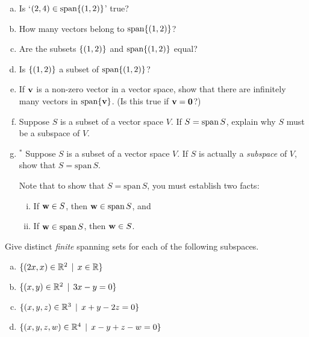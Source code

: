 \begin{prob}
\begin{enumerate}[a)]
%
\item Is `$(2,4) \in \textrm{span}\{(1,2)\}$' true?
\medskip
%

\item\sov How many vectors belong to $\textrm{span}\{(1,2)\}$?
\medskip
%
\item Are the subsets $\{(1,2) \}$ and  $\textrm{span}\{(1,2)\}$ equal?
\medskip
%
\item\sov Is  $\{(1,2) \}$ a subset of  $\textrm{span}\{(1,2)\}$?
\medskip
%
\item 
\medskip If $\mathbf{v}$ is a non-zero vector in a vector space, show that there are infinitely many vectors in $\textrm{span}\{\mathbf{v}\}$. (Is this true if $\mathbf{v}=\mathbf{0}$?)\medskip
%
\item\sov  Suppose $S$ is a subset of a vector space $V$.  If $S= \textrm{span}\, S$,  explain why $S$ must be a subspace of $V$.  
\medskip
%

\item$^\ast$ Suppose $S$ is a subset of a vector space $V$.  If $S$ is actually a {\it subspace} of $V$, show that  $S= \text{span}\, S$.  

\medskip Note that to show that $S= \text{span}\, S$, you must establish two facts:
\begin{enumerate}[(i)]
\item If $\mathbf{w}\in S$, then $\mathbf{w}\in \text{span}\, S$, and

\item If $\mathbf{w}\in \text{span}\, S$, then $\mathbf{w}\in S$.
\end{enumerate}
\medskip
%

\end{enumerate}

\end{prob} \begin{prob} \label{prob06.3} Give  distinct {\it finite} spanning sets for each of the following subspaces.
\medskip

\begin{enumerate}[a)]

\item  $\{(2x, x) \in \mathbb{R}^2\,\mid \, x\in \mathbb{R} \}$\medskip

\item\sov  $\{(x, y) \in \mathbb{R}^2\,\mid \, 3x - y=0  \}$ \medskip
%

 
 
\item  $\{(x, y, z) \in \mathbb{R}^3\,\mid \, x+y-2z=0  \}$   \medskip
%

\item\sov  $\{(x, y, z, w) \in \mathbb{R}^4\,\mid \, x-y+z-w=0  \}$   \medskip
%


\end{enumerate}
\end{prob}
